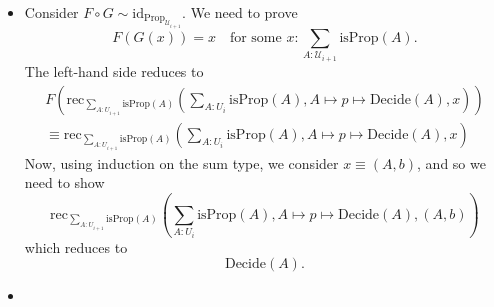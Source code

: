 \documentclass[14pt]{extarticle}
\newcommand{\0}{{\mathbf 0}}
\newcommand{\1}{{\mathbf 1}}
\newcommand{\2}{{\mathbf 2}}
\newcommand{\UU}{{\mathcal U}}
\newcommand{\mt}{\mapsto}
\newcommand{\rec}{\mathrm{rec}}
\newcommand{\id}{\mathrm{id}}
\newcommand{\isProp}{\mathrm{isProp}}
\newcommand{\Prop}{\mathrm{Prop}}
\begin{document}
\begin{itemize}
\item Consider $F \circ G \sim \id_{\Prop_{\UU_{i+1}}}$. We need to prove
\[F(G(x)) = x \quad \text{for some } x : \sum_{A : \UU_{i+1}}\isProp(A).\] The left-hand side reduces to
\begin{multline*}
F\left(\rec_{\sum_{A : U_{i+1}}\isProp(A)}\left(\sum_{A : U_i}\isProp(A),A \mt p \mt \mathrm{Decide}(A) ,x\right)\right) \\
\equiv \rec_{\sum_{A : U_{i+1}}\isProp(A)}\left(\sum_{A : U_i}\isProp(A),A \mt p \mt \mathrm{Decide}(A) ,x\right)
\end{multline*}
Now, using induction on the sum type, we consider $x \equiv (A,b)$, and so we need to show
\[\rec_{\sum_{A : U_{i+1}}\isProp(A)}\left(\sum_{A : U_i}\isProp(A),A \mt p \mt \mathrm{Decide}(A) ,(A,b)\right)\] which reduces to 
\[\mathrm{Decide}(A).\]
\item 
\end{itemize}
\end{document}
